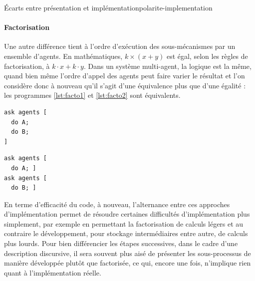 \begin{encadre}{Écarts entre présentation et implémentation}{polarite-implementation}
\paragraph{Factorisation} Une autre différence tient à l'ordre d'exécution des sous-mécanismes par un ensemble d'agents. En mathématiques, $k\times (x+y)$ est égal, selon les règles de factorisation, à $k{\cdot}x + k{\cdot}y$.
Dans un système multi-agent, la logique est la même, quand bien même l'ordre d'appel des agents peut faire varier le résultat et l'on considère donc à nouveau qu'il s'agit d'une équivalence plus que d'une égalité : les programmes \ref{lst:facto1} et \ref{lst:facto2} sont équivalents.\bigskip

\noindent\begin{minipage}[b]{.45\textwidth}
	\begin{lstlisting}[caption={Factorisé},frame=tlrb, captionpos=b, label = {lst:facto1}]
ask agents [
  do A;
  do B;
]
	\end{lstlisting}
\end{minipage}\hfill
\begin{minipage}[b]{.45\textwidth}
	\begin{lstlisting}[caption={Développé},frame=tlrb, captionpos=b, label = {lst:facto2}]
ask agents [
  do A; ]
ask agents [
  do B; ]
	\end{lstlisting}
\end{minipage}

En terme d'efficacité du code, à nouveau, l'alternance entre ces approches d'implémentation permet de résoudre certaines difficultés d'implémentation plus simplement, par exemple en permettant la factorisation de calculs légers et au contraire le développement, pour stockage intermédiaires entre autre, de calculs plus lourds.
Pour bien différencier les étapes successives, dans le cadre d'une description discursive, il sera souvent plus aisé de présenter les sous-processus de manière développée plutôt que factorisée, ce qui, encore une fois, n'implique rien quant à l'implémentation réelle.


\end{encadre}
